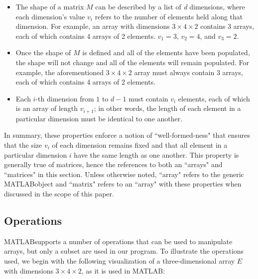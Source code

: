 \documentclass[11pt,conference]{IEEEtran}
\newcommand{\matlab}{MATLAB}
\theoremstyle{plain} %
\theoremstyle{definition}
\theoremstyle{remark}
\begin{document}
\begin{itemize}
    \item The shape of a matrix \textbf{$M$} can be described by a list of \textit{d} dimensions, where each dimension's value $v_i$ refers to the number of elements held along that dimension. For example, an array with dimensions $3 \times 4 \times 2$ contains 3 arrays, each of which contains 4 arrays of 2 elements. $v_1 = 3$, $v_2 = 4$, and $v_3 = 2$.
    \item Once the shape of \textbf{$M$} is defined and all of the elements have been populated, the shape will not change and all of the elements will remain populated. For example, the aforementioned $3 \times 4 \times 2$ array must always contain 3 arrays, each of which contains 4 arrays of 2 elements.
    \item Each $i$-th dimension from $1$ to $d-1$ must contain $v_i$ elements, each of which is an array of length $v_{i+1}$; in other words, the length of each element in a particular dimension must be identical to one another.
\end{itemize}

In summary, these properties enforce a notion of ``well-formed-ness" that ensures that the size $v_i$ of each dimension remains fixed and that all element in a particular dimension $i$ have the same length as one another. This property is generally true of matrices, hence the references to both an ``arrays" and ``matrices" in this section. Unless otherwise noted, ``array" refers to the generic \matlab\@ object and ``matrix" refers to an ``array" with these properties when discussed in the scope of this paper.

\subsection{Operations} \matlab\@ supports a number of operations that can be used to manipulate arrays, but only a subset are used in our program. To illustrate the operations used, we begin with the following visualization of a three-dimensional array \textbf{$E$} with dimensions $3 \times 4 \times 2$, as it is used in \matlab:\\

\end{document}
